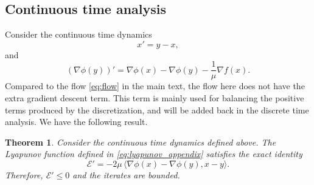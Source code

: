 \documentclass{article}
\theoremstyle{plain}
\newtheorem{theorem}{Theorem}[section]
\theoremstyle{definition}
\theoremstyle{remark}
\begin{document}
\subsection{Continuous time analysis}
Consider the continuous time dynamics
\[
x'=y-x,
\]
and
\[
(\nabla \phi(y))'
=\nabla \phi(x)-\nabla \phi(y)-\frac1\mu \nabla f(x).
\]
Compared to the flow \eqref{eq:flow} in the main text, the flow here does not have the extra gradient descent term. This term is mainly used for balancing the positive terms produced by the discretization, and will be added back in the discrete time analysis. We have the following result.
\begin{theorem}
Consider the continuous time dynamics defined above. The Lyapunov function defined in \eqref{eq:lyapunov_appendix} satisfies the exact identity
\[
\mathcal{E}'
=-2\mu \,\langle \nabla\phi(x)-\nabla\phi(y),x-y\rangle.
\]
Therefore, \(\mathcal{E}'\le 0\) and the iterates are bounded.
\end{theorem}
\end{document}
